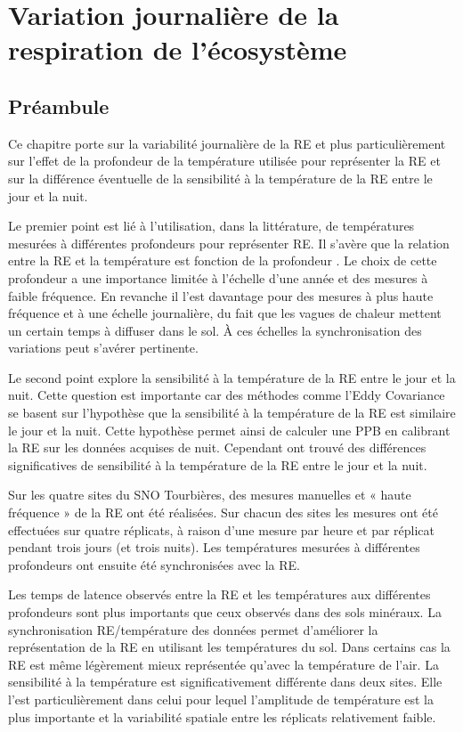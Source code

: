 \singlespacing
\chapter{Variation journalière de la respiration de l'écosystème}
\label{ch:ch5}

\minitoc

\newpage

\doublespacing
\section{Préambule}

Ce chapitre porte sur la variabilité journalière de la RE et plus particulièrement sur l'effet de la profondeur de la température utilisée pour représenter la RE et sur la différence éventuelle de la sensibilité à la température de la RE entre le jour et la nuit.

Le premier point est lié à l'utilisation, dans la littérature, de températures mesurées à différentes profondeurs pour représenter RE.
Il s'avère que la relation entre la RE et la température est fonction de la profondeur \citep{pavelka2007,graf2008}.
Le choix de cette profondeur a une importance limitée à l'échelle d'une année et des mesures à faible fréquence.
En revanche il l'est davantage pour des mesures à plus haute fréquence et à une échelle journalière, du fait que les vagues de chaleur mettent un certain temps à diffuser dans le sol.
À ces échelles la synchronisation des variations peut s'avérer pertinente. 

Le second point explore la sensibilité à la température de la RE entre le jour et la nuit.
Cette question est importante car des méthodes comme l'Eddy Covariance se basent sur l'hypothèse que la sensibilité à la température de la RE est similaire le jour et la nuit.
Cette hypothèse permet ainsi de calculer une PPB en calibrant la RE sur les données acquises de nuit.
Cependant \citet{juszczak2012} ont trouvé des différences significatives de sensibilité à la température de la RE entre le jour et la nuit.

Sur les quatre sites du SNO Tourbières, des mesures manuelles et « haute fréquence » de la RE ont été réalisées.
Sur chacun des sites les mesures ont été effectuées sur quatre réplicats, à raison d'une mesure par heure et par réplicat pendant trois jours (et trois nuits).
Les températures mesurées à différentes profondeurs ont ensuite été synchronisées avec la RE.

Les temps de latence observés entre la RE et les températures aux différentes profondeurs sont plus importants que ceux observés dans des sols minéraux.
La synchronisation RE/température des données permet d'améliorer la représentation de la RE en utilisant les températures du sol.
Dans certains cas la RE est même légèrement mieux représentée qu'avec la température de l'air.
La sensibilité à la température est significativement différente dans deux sites.
Elle l'est particulièrement dans celui pour lequel l'amplitude de température est la plus importante et la variabilité spatiale entre les réplicats relativement faible.



